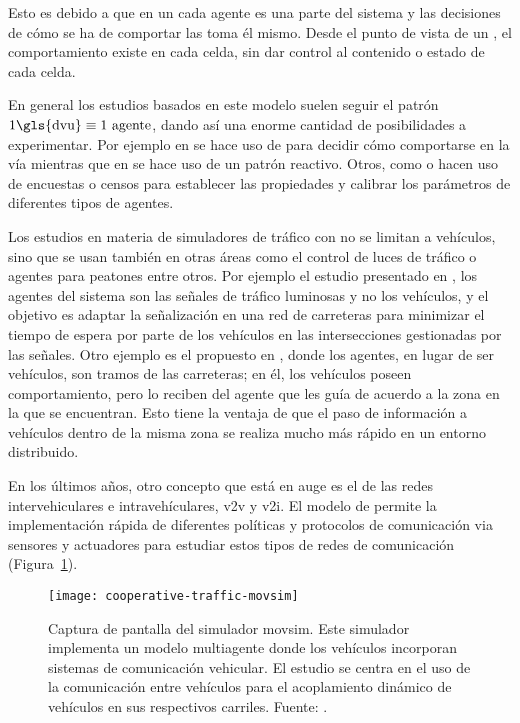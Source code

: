 Esto es debido a que en un  cada agente es una parte del sistema y las decisiones de cómo se ha de comportar las toma él mismo. Desde el punto de vista de un , el comportamiento existe en cada celda, sin dar control al contenido o estado de cada celda.

En general los estudios basados en este modelo suelen seguir el patrón $1 \text{\gls{dvu}\index{driver-vehicle unit}} \equiv 1 \text{ agente}$, dando así una enorme cantidad de posibilidades a experimentar. Por ejemplo en \cite{Das} se hace uso de  para decidir cómo comportarse en la vía mientras que en \cite{Ehlert2001} se hace uso de un patrón reactivo. Otros, como \cite{Dia2002} o \cite{Balmer} hacen uso de encuestas o censos para establecer las propiedades y calibrar los parámetros de diferentes tipos de agentes.

Los estudios en materia de simuladores de tráfico con  no se limitan a vehículos, sino que se usan también en otras áreas como el control de luces de tráfico o agentes para peatones entre otros. Por ejemplo el estudio presentado en \cite{Clymer2002}, los agentes del sistema son las señales de tráfico luminosas y no los vehículos, y el objetivo es adaptar la señalización en una red de carreteras para minimizar el tiempo de espera por parte de los vehículos en las intersecciones gestionadas por las señales. Otro ejemplo es el propuesto en \cite{Galis2000}, donde los agentes, en lugar de ser vehículos, son tramos de las carreteras; en él, los vehículos poseen comportamiento, pero lo reciben del agente que les guía de acuerdo a la zona en la que se encuentran. Esto tiene la ventaja de que el paso de información a vehículos dentro de la misma zona se realiza mucho más rápido en un entorno distribuido.

En los últimos años, otro concepto que está en auge es el de las redes intervehiculares e intravehículares, \gls{v2v} y \gls{v2i}. El modelo de  permite la implementación rápida de diferentes políticas y protocolos de comunicación via sensores y actuadores para estudiar estos tipos de redes de comunicación (Figura~\ref{fig:cooperative-traffic-movsim}).

\begin{figure}
	\centering
	\texttt{[image: cooperative-traffic-movsim]}
	\caption[Captura de pantalla del simulador \gls{movsim}]{Captura de pantalla del simulador \gls{movsim}. Este simulador implementa un modelo multiagente donde los vehículos incorporan sistemas de comunicación vehicular. El estudio se centra en el uso de la comunicación entre vehículos para el acoplamiento dinámico de vehículos en sus respectivos carriles. Fuente: \cite{Gu2015}.}
	\label{fig:cooperative-traffic-movsim}
\end{figure}

